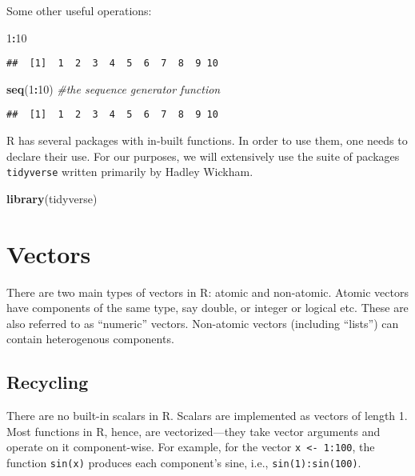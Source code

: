 \documentclass[11pt,]{article}
\newenvironment{Shaded}{\begin{snugshade}}{\end{snugshade}}
\newcommand{\KeywordTok}[1]{\textcolor[rgb]{0.13,0.29,0.53}{\textbf{#1}}}
\newcommand{\DecValTok}[1]{\textcolor[rgb]{0.00,0.00,0.81}{#1}}
\newcommand{\CommentTok}[1]{\textcolor[rgb]{0.56,0.35,0.01}{\textit{#1}}}
\newcommand{\OperatorTok}[1]{\textcolor[rgb]{0.81,0.36,0.00}{\textbf{#1}}}
\newcommand{\NormalTok}[1]{#1}
\begin{document}
Some other useful operations:

\begin{Shaded}
\begin{Highlighting}[]
\DecValTok{1}\OperatorTok{:}\DecValTok{10}
\end{Highlighting}
\end{Shaded}

\begin{verbatim}
##  [1]  1  2  3  4  5  6  7  8  9 10
\end{verbatim}

\begin{Shaded}
\begin{Highlighting}[]
\KeywordTok{seq}\NormalTok{(}\DecValTok{1}\OperatorTok{:}\DecValTok{10}\NormalTok{) }\CommentTok{#the sequence generator function}
\end{Highlighting}
\end{Shaded}

\begin{verbatim}
##  [1]  1  2  3  4  5  6  7  8  9 10
\end{verbatim}

R has several packages with in-built functions. In order to use them,
one needs to declare their use. For our purposes, we will extensively
use the suite of packages \texttt{tidyverse} written primarily by Hadley
Wickham.

\begin{Shaded}
\begin{Highlighting}[]
\KeywordTok{library}\NormalTok{(tidyverse)}
\end{Highlighting}
\end{Shaded}

\section{Vectors}\label{vectors}

There are two main types of vectors in R: atomic and non-atomic. Atomic
vectors have components of the same type, say double, or integer or
logical etc. These are also referred to as ``numeric'' vectors.
Non-atomic vectors (including ``lists'') can contain heterogenous
components.

\subsection{Recycling}\label{recycling}

There are no built-in scalars in R. Scalars are implemented as vectors
of length 1. Most functions in R, hence, are vectorized---they take
vector arguments and operate on it component-wise. For example, for the
vector \texttt{x\ \textless{}-\ 1:100}, the function \texttt{sin(x)}
produces each component's sine, i.e., \texttt{sin(1):sin(100)}.
\end{document}
